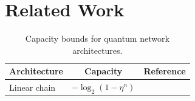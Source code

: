 \section{Related Work}

\begin{table}[h]
\centering
\caption{Capacity bounds for quantum network architectures.}
\begin{tabular}{lcc}
\hline
Architecture & Capacity & Reference \\
\hline
Linear chain & $-\log_2(1 - \eta^n)$ & \cite{pirandola2019capacities} \\
\hline
\end{tabular}
\end{table}
